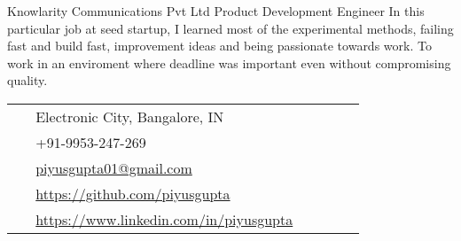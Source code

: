 \documentclass[10pt]{article} %
\begin{document}
\begin{paracol}{2}

{} %
{Knowlarity Communications Pvt Ltd} %
{Product Development Engineer} %
{In this particular job at seed startup, I learned most of the experimental methods, failing fast and build fast, improvement ideas and being passionate towards work. To work in an enviroment where deadline was important even without compromising quality.} %

\vspace{-\baselineskip}\medskip %

\medskip %


\switchcolumn %


\parbox[top][0.12\textheight][c]{\linewidth}{ %
	\vspace{-0.04\textheight} %
	\colorbox{shade}{ %
		\begin{supertabular}{p{0.05\linewidth}|p{0.775\linewidth}} %
            \raisebox{-1pt}{\faHome} & Electronic City, Bangalore, IN \\ %
			\raisebox{-1pt}{\faPhone} & +91-9953-247-269 \\ %
			\raisebox{0pt}{\small\faEnvelope} & \href{mailto:piyusgupta01@gmail.com}{piyusgupta01@gmail.com} \\ %
			\raisebox{-1pt}{\faGithub} & \href{https://github.com/piyusgupta}{https://github.com/piyusgupta} \\ %
			\raisebox{-1pt}{\faLinkedinSquare} & \href{https://www.linkedin.com/in/piyusgupta}{https://www.linkedin.com/in/piyusgupta} \\ %
		\end{supertabular}
	}
}


\end{paracol}
\end{document}
